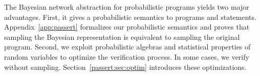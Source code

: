 

The Bayesian network abstraction for probabilistic programs yields two major
advantages.
First, it gives a probabilistic semantics to programs and \passert
statements.
Appendix~\ref{app:passert} formalizes our probabilistic semantics and proves that
sampling the Bayesian representation is equivalent to sampling the original
program.
Second, we exploit 
probabilistic algebras and statistical properties of random variables to optimize the
verification process. In some cases, we verify \passerts without sampling.
Section~\ref{passert:sec:optim} introduces these 
optimizations.



